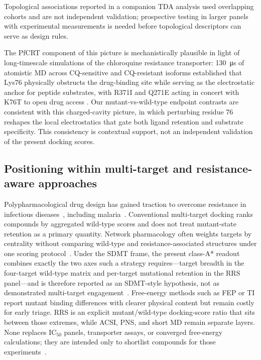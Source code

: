 \documentclass[journal=jcisd8,manuscript=article,layout=traditional]{achemso}
\begin{document}
Topological associations reported in a companion TDA analysis \citep{temgoua2026quantum} used overlapping cohorts and are not independent validation; prospective testing in larger panels with experimental measurements is needed before topological descriptors can serve as design rules.

The PfCRT component of this picture is mechanistically plausible in light of long-timescale simulations of the chloroquine resistance transporter: \qty{130}{\micro\second} of atomistic MD across CQ-sensitive and CQ-resistant isoforms established that Lys76 physically obstructs the drug-binding site while serving as the electrostatic anchor for peptide substrates, with R371I and Q271E acting in concert with K76T to open drug access \citep{tanner2025pfcrt}. Our mutant-vs-wild-type endpoint contrasts are consistent with this charged-cavity picture, in which perturbing residue \num{76} reshapes the local electrostatics that gate both ligand retention and substrate specificity. This consistency is contextual support, not an independent validation of the present docking scores.

\subsection{Positioning within multi-target and resistance-aware approaches}

Polypharmacological drug design has gained traction to overcome resistance in infectious diseases~\citep{hegedus2025polypharmacology,rafehi2024medicinal}, including malaria~\citep{polypharmacology_malaria_2026,multi_target_antimalarials_2025}. Conventional multi-target docking ranks compounds by aggregated wild-type scores and does not treat mutant-state retention as a primary quantity. Network pharmacology often weights targets by centrality without comparing wild-type and resistance-associated structures under one scoring protocol~\citep{Sentinel2025Offtarget,abdelhamid2025polypharmacology_ai}. Under the SDMT frame, the present class-A* readout combines exactly the two axes such a strategy requires---target breadth in the four-target wild-type matrix and per-target mutational retention in the RRS panel---and is therefore reported as an SDMT-style hypothesis, not as demonstrated multi-target engagement~\citep{sdmt2026trends}. Free-energy methods such as FEP or TI report mutant binding differences with clearer physical content but remain costly for early triage. RRS is an explicit mutant/wild-type docking-score ratio that sits between those extremes, while ACSI, PNS, and short MD remain separate layers. None replaces IC$_{50}$ panels, transporter assays, or converged free-energy calculations; they are intended only to shortlist compounds for those experiments~\citep{temgoua2026quantum,multi_target_antimalarials_2025,ghosh2025pfcrt_pfdhfr}.
\end{document}
